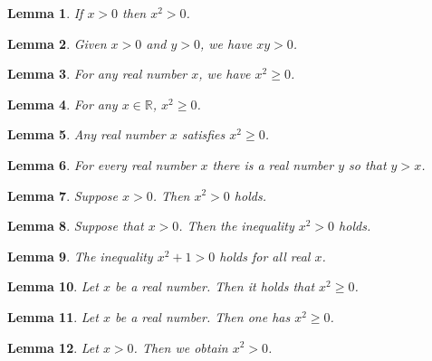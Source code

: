 \documentclass{article}
\newtheorem{lemma}{Lemma}
\begin{document}

\begin{lemma}\label{p1}
If $x>0$ then $x^2>0$.
\end{lemma}

\begin{lemma}\label{p2}
Given $x>0$ and $y>0$, we have $xy>0$.
\end{lemma}

\begin{lemma}\label{p3}
For any real number $x$, we have $x^2\ge0$.
\end{lemma}

\begin{lemma}\label{p4}
For any $x\in\mathbb{R}$, $x^2\ge0$.
\end{lemma}

\begin{lemma}\label{p5}
Any real number $x$ satisfies $x^2\geq 0$.
\end{lemma}

\begin{lemma}\label{p6}
For every real number $x$ there is a real number $y$ so that $y>x$.
\end{lemma}

\begin{lemma}\label{p7}
Suppose $x>0$. Then $x^2>0$ holds.
\end{lemma}

\begin{lemma}\label{p8}
Suppose that $x>0$. Then the inequality $x^2>0$ holds.
\end{lemma}

\begin{lemma}\label{p9}
The inequality $x^2+1>0$ holds for all real $x$.
\end{lemma}

\begin{lemma}\label{p10}
Let $x$ be a real number. Then it holds that $x^2\ge0$.
\end{lemma}

\begin{lemma}\label{p11}
Let $x$ be a real number. Then one has $x^2\ge0$.
\end{lemma}

\begin{lemma}\label{p12}
Let $x>0$. Then we obtain $x^2>0$.
\end{lemma}
\end{document}
